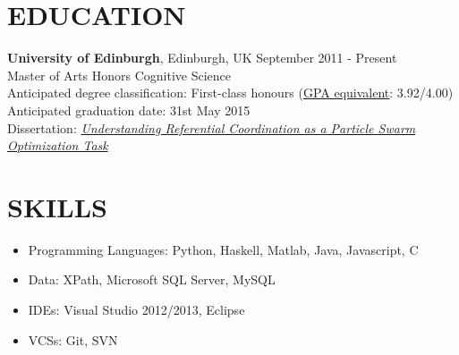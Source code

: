 \documentclass[line, margin]{res}
\newcommand{\CS}{C\nolinebreak\hspace{-.05em}\raisebox{.6ex}{\scriptsize\bf \#}}
\begin{document}
\address{24 Lutton Place, Edinburgh, Scotland EH8 9PE | +44 771 966 3016 | chase@chasestevens.com}

\begin{resume}
\section{EDUCATION}
\textbf{University of Edinburgh}, Edinburgh, UK \hfill September 2011 - Present\\
Master of Arts Honors Cognitive Science \\
Anticipated degree classification: First-class honours (\href{http://www.ed.ac.uk/schools-departments/humanities-soc-sci/visiting-exchange/academic-support/credits-grading}{GPA equivalent}: 3.92/4.00)\\
Anticipated graduation date: 31st May 2015\\
Dissertation: \textit{\href{http://www.chasestevens.com/papers/undergrad_dissertation.pdf}{Understanding Referential Coordination as a Particle Swarm Optimization Task}}

\section{SKILLS}
\begin{itemize}[leftmargin=10pt]
\item Programming Languages: Python, Haskell, Matlab, Java, Javascript, \CS
\item Data: XPath, Microsoft SQL Server, MySQL
\item IDEs: Visual Studio 2012/2013, Eclipse
\item VCSs: Git, SVN
\end{itemize}


\end{resume}
\end{document}
